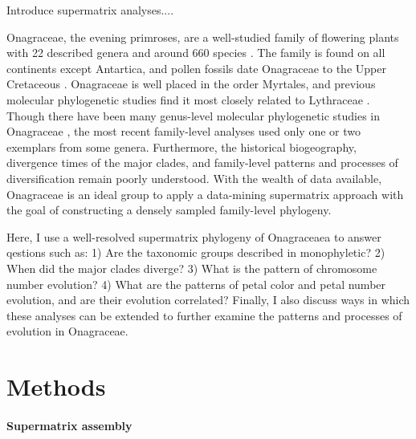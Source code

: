 \documentclass[review]{elsarticle}
\begin{document}
Introduce supermatrix analyses....

Onagraceae, the evening primroses, are a well-studied family
of flowering plants with 22 described genera and around 660 species \citep{wagner2007revised}.
The family is found on all continents except Antartica,
and pollen fossils date Onagraceae to the Upper Cretaceous \citep{grimsson}.
Onagraceae is well placed in the order Myrtales,
and previous molecular phylogenetic studies find it most closely related to Lythraceae \citep{conti1997, Sytsma2004}.
Though there have been many genus-level molecular phylogenetic studies in Onagraceae
\citep{Berry2004, Evans2009, Hoggard2004, Xie2009, Baum1994, Wagner2005}, 
the most recent family-level analyses \citep{Levin2003, Levin2004}
used only one or two exemplars from some genera. 
Furthermore, the historical biogeography, divergence times of the major clades, and 
family-level patterns and processes of diversification remain poorly understood.
With the wealth of data available, Onagraceae is an
ideal group to apply a data-mining supermatrix approach
with the goal of constructing a densely sampled family-level phylogeny.

Here, I use a well-resolved supermatrix phylogeny of Onagraceaea to
answer qestions such as:
1) Are the taxonomic groups described in \citet{wagner2007revised} monophyletic?
2) When did the major clades diverge?
3) What is the pattern of chromosome number
evolution?
4) What are the patterns of petal color and petal number evolution, and are their 
evolution correlated?
Finally, I also discuss ways in which these analyses can be extended
to further examine the patterns and processes of
evolution in Onagraceae.


\section{Methods}

\paragraph{Supermatrix assembly} 
\end{document}
